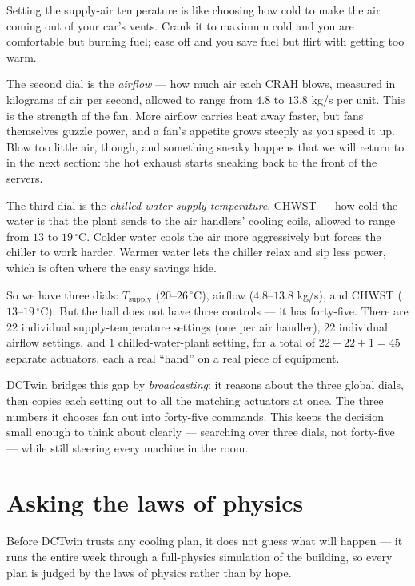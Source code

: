 \begin{analogy}
Setting the supply-air temperature is like choosing how cold to make the air coming out of your car's vents. Crank it to maximum cold and you are comfortable but burning fuel; ease off and you save fuel but flirt with getting too warm.
\end{analogy}

The second dial is the \emph{airflow} --- how much air each CRAH blows, measured in kilograms of air per second, allowed to range from $4.8$ to $13.8$ kg/s per unit. This is the strength of the fan. More airflow carries heat away faster, but fans themselves guzzle power, and a fan's appetite grows steeply as you speed it up. Blow too little air, though, and something sneaky happens that we will return to in the next section: the hot exhaust starts sneaking back to the front of the servers.

The third dial is the \emph{chilled-water supply temperature}, CHWST --- how cold the water is that the plant sends to the air handlers' cooling coils, allowed to range from $13$ to $19\,^\circ$C. Colder water cools the air more aggressively but forces the chiller to work harder. Warmer water lets the chiller relax and sip less power, which is often where the easy savings hide.

So we have three dials: $T_{\text{supply}}$ ($20$--$26\,^\circ$C), airflow ($4.8$--$13.8$ kg/s), and CHWST ($13$--$19\,^\circ$C). But the hall does not have three controls --- it has forty-five. There are 22 individual supply-temperature settings (one per air handler), 22 individual airflow settings, and 1 chilled-water-plant setting, for a total of $22 + 22 + 1 = 45$ separate actuators, each a real ``hand'' on a real piece of equipment.

DCTwin bridges this gap by \emph{broadcasting}: it reasons about the three global dials, then copies each setting out to all the matching actuators at once. The three numbers it chooses fan out into forty-five commands. This keeps the decision small enough to think about clearly --- searching over three dials, not forty-five --- while still steering every machine in the room.

\section{Asking the laws of physics}
\label{sec:oracle}

\begin{keyidea}
Before DCTwin trusts any cooling plan, it does not guess what will happen --- it runs the entire week through a full-physics simulation of the building, so every plan is judged by the laws of physics rather than by hope.
\end{keyidea}

